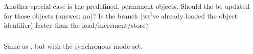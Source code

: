 \documentclass{article}
\begin{document}
\subsubsection{}
\begin{adi3}
\end{adi3}


Another special case is the predefined, permanent objects.  Should the
 be updated for those objects (answer:
no)?  Is the branch (we've already loaded the object identifier)
faster than the 
load/increment/store?  

\subsubsection{}
Same as , but with the synchronous mode set.  
\end{document}

